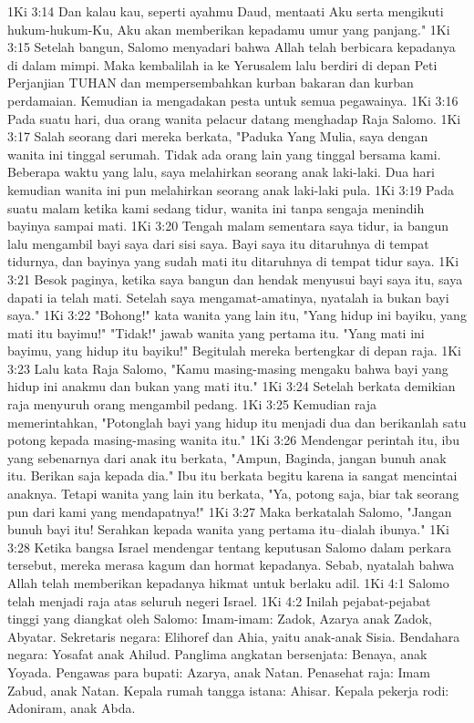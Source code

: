 1Ki 3:14  Dan kalau kau, seperti ayahmu Daud, mentaati Aku serta mengikuti hukum-hukum-Ku, Aku akan memberikan kepadamu umur yang panjang."
1Ki 3:15  Setelah bangun, Salomo menyadari bahwa Allah telah berbicara kepadanya di dalam mimpi. Maka kembalilah ia ke Yerusalem lalu berdiri di depan Peti Perjanjian TUHAN dan mempersembahkan kurban bakaran dan kurban perdamaian. Kemudian ia mengadakan pesta untuk semua pegawainya.
1Ki 3:16  Pada suatu hari, dua orang wanita pelacur datang menghadap Raja Salomo.
1Ki 3:17  Salah seorang dari mereka berkata, "Paduka Yang Mulia, saya dengan wanita ini tinggal serumah. Tidak ada orang lain yang tinggal bersama kami. Beberapa waktu yang lalu, saya melahirkan seorang anak laki-laki. Dua hari kemudian wanita ini pun melahirkan seorang anak laki-laki pula.
1Ki 3:19  Pada suatu malam ketika kami sedang tidur, wanita ini tanpa sengaja menindih bayinya sampai mati.
1Ki 3:20  Tengah malam sementara saya tidur, ia bangun lalu mengambil bayi saya dari sisi saya. Bayi saya itu ditaruhnya di tempat tidurnya, dan bayinya yang sudah mati itu ditaruhnya di tempat tidur saya.
1Ki 3:21  Besok paginya, ketika saya bangun dan hendak menyusui bayi saya itu, saya dapati ia telah mati. Setelah saya mengamat-amatinya, nyatalah ia bukan bayi saya."
1Ki 3:22  "Bohong!" kata wanita yang lain itu, "Yang hidup ini bayiku, yang mati itu bayimu!" "Tidak!" jawab wanita yang pertama itu. "Yang mati ini bayimu, yang hidup itu bayiku!" Begitulah mereka bertengkar di depan raja.
1Ki 3:23  Lalu kata Raja Salomo, "Kamu masing-masing mengaku bahwa bayi yang hidup ini anakmu dan bukan yang mati itu."
1Ki 3:24  Setelah berkata demikian raja menyuruh orang mengambil pedang.
1Ki 3:25  Kemudian raja memerintahkan, "Potonglah bayi yang hidup itu menjadi dua dan berikanlah satu potong kepada masing-masing wanita itu."
1Ki 3:26  Mendengar perintah itu, ibu yang sebenarnya dari anak itu berkata, "Ampun, Baginda, jangan bunuh anak itu. Berikan saja kepada dia." Ibu itu berkata begitu karena ia sangat mencintai anaknya. Tetapi wanita yang lain itu berkata, "Ya, potong saja, biar tak seorang pun dari kami yang mendapatnya!"
1Ki 3:27  Maka berkatalah Salomo, "Jangan bunuh bayi itu! Serahkan kepada wanita yang pertama itu--dialah ibunya."
1Ki 3:28  Ketika bangsa Israel mendengar tentang keputusan Salomo dalam perkara tersebut, mereka merasa kagum dan hormat kepadanya. Sebab, nyatalah bahwa Allah telah memberikan kepadanya hikmat untuk berlaku adil.
1Ki 4:1  Salomo telah menjadi raja atas seluruh negeri Israel.
1Ki 4:2  Inilah pejabat-pejabat tinggi yang diangkat oleh Salomo: Imam-imam: Zadok, Azarya anak Zadok, Abyatar. Sekretaris negara: Elihoref dan Ahia, yaitu anak-anak Sisia. Bendahara negara: Yosafat anak Ahilud. Panglima angkatan bersenjata: Benaya, anak Yoyada. Pengawas para bupati: Azarya, anak Natan. Penasehat raja: Imam Zabud, anak Natan. Kepala rumah tangga istana: Ahisar. Kepala pekerja rodi: Adoniram, anak Abda.
